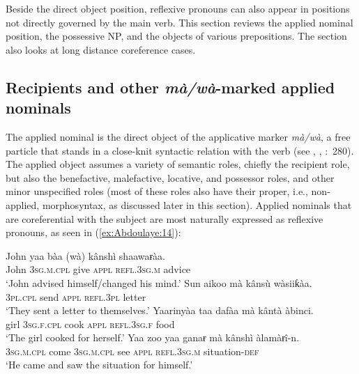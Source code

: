 \documentclass[output=paper]{langscibook}
\begin{document}
Beside the direct object position, reflexive pronouns can also appear in positions not directly governed by the main verb. This section reviews the applied nominal position, the possessive NP, and the objects of various prepositions. The section also looks at long distance coreference cases.

\subsection{Recipients and other \textit{mà/wà}{}-marked applied nominals}\label{sec:Abdoulaye:4.1}

The applied nominal is the direct object of the applicative marker \textit{mà/wà}, a free particle that stands in a close-knit syntactic relation with the verb (see \citealt{Tuller1984}, \citealt{Abdoulaye1996}, \citealt{Newman2000}:~280). The applied object assumes a variety of semantic roles, chiefly the recipient role, but also the benefactive, malefactive, locative, and possessor roles, and other minor unspecified roles (most of these roles also have their proper, i.e., non-applied, morphosyntax, as discussed later in this section). Applied nominals that are coreferential with the subject are most naturally expressed as reflexive pronouns, as seen in (\ref{ex:Abdoulaye:14}):

\ea%
    \label{ex:Abdoulaye:14}
    \ea \label{ex:Abdoulaye:14a}
    \gll John  yaa  bàa  (wà)  kânshì  shaawaɍàa. \\
    John  \textsc{3sg.m.cpl}  give  \textsc{appl}  \textsc{refl.3sg.m}  advice\\
    \glt `John advised himself/changed his mind.’
    \ex \label{ex:Abdoulaye:14b}
    \gll Sun  aikoo  mà  kânsù  wàsiiƙàa.\\
    \textsc{3pl.cpl}  send  \textsc{appl}  \textsc{refl.3pl}  letter\\
     \glt `They sent a letter to themselves.’
    \ex \label{ex:Abdoulaye:14c}
    \gll Yaarinyàa  taa  dafàa  mà  kântà  àbinci.\\
    girl  \textsc{3sg.f.cpl}  cook  \textsc{appl}  \textsc{refl.3sg.f}  food\\
     \glt `The girl cooked for herself.’
    \ex \label{ex:Abdoulaye:14d}
    \gll Yaa  zoo  yaa  ganaɍ  mà  kânshì  àlamàɍî-n.\\
    \textsc{3sg.m.cpl}  come  \textsc{3sg.m.cpl}  see  \textsc{appl}  \textsc{refl.3sg.m}  situation{}-\textsc{def}\\
     \glt `He came and saw the situation for himself.’
     \z
\z 
    
\end{document}
